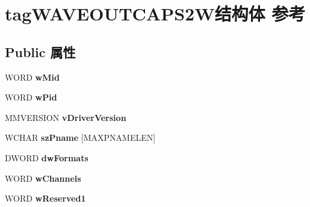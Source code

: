 \hypertarget{structtag_w_a_v_e_o_u_t_c_a_p_s2_w}{}\section{tag\+W\+A\+V\+E\+O\+U\+T\+C\+A\+P\+S2\+W结构体 参考}
\label{structtag_w_a_v_e_o_u_t_c_a_p_s2_w}
\subsection*{Public 属性}
\begin{DoxyCompactItemize}
\item 
\mbox{\label{structtag_w_a_v_e_o_u_t_c_a_p_s2_w_af4d75d3e167b6137404364c06c4b00b4}} 
W\+O\+RD {\bfseries w\+Mid}
\item 
\mbox{\label{structtag_w_a_v_e_o_u_t_c_a_p_s2_w_aab55475911251fdb2856d7b387085296}} 
W\+O\+RD {\bfseries w\+Pid}
\item 
\mbox{\label{structtag_w_a_v_e_o_u_t_c_a_p_s2_w_a1746340280c43c2e4f2b8b357393aeac}} 
M\+M\+V\+E\+R\+S\+I\+ON {\bfseries v\+Driver\+Version}
\item 
\mbox{\label{structtag_w_a_v_e_o_u_t_c_a_p_s2_w_a74d4ad45619293512c0db115cd00a945}} 
W\+C\+H\+AR {\bfseries sz\+Pname} \mbox{[}M\+A\+X\+P\+N\+A\+M\+E\+L\+EN\mbox{]}
\item 
\mbox{\label{structtag_w_a_v_e_o_u_t_c_a_p_s2_w_a5502c1e0037153eb31a050997f4afe31}} 
D\+W\+O\+RD {\bfseries dw\+Formats}
\item 
\mbox{\label{structtag_w_a_v_e_o_u_t_c_a_p_s2_w_a8b79c74f5c2e7876cacad8a42a3c68cc}} 
W\+O\+RD {\bfseries w\+Channels}
\item 
\mbox{\label{structtag_w_a_v_e_o_u_t_c_a_p_s2_w_a405f13d173d274d644193438eb5853b2}} 
W\+O\+RD {\bfseries w\+Reserved1}
\item 
\mbox{\label{structtag_w_a_v_e_o_u_t_c_a_p_s2_w_a52249b819860198b2dc4c478916d09a3}} 

\end{DoxyCompactItemize}
